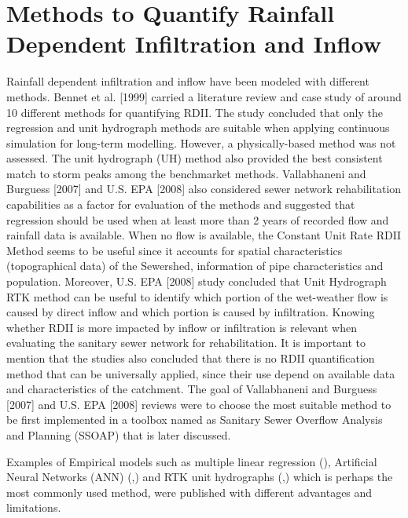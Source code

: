 \section{Methods to Quantify Rainfall Dependent Infiltration and Inflow}
\label{methods_rdii}

Rainfall dependent infiltration and inflow have been modeled with different methods. Bennet et al. [1999] \cite{Bennett1999} carried a literature review and case study of around 10 different methods for quantifying RDII. 
The study concluded that only the regression and unit hydrograph methods are suitable when applying continuous simulation for long-term modelling. However, a physically-based method was not assessed. The unit hydrograph (UH) method also provided the best consistent match to storm peaks among the benchmarket methods. Vallabhaneni and Burguess [2007] \cite{Vallabhaneni2007} and U.S. EPA [2008] \cite{epa2008}  also considered sewer network rehabilitation capabilities as a factor for evaluation of the methods and suggested that regression should be used when at least more than 2 years of recorded flow and rainfall data is available. When no flow is available, the Constant Unit Rate RDII Method seems to be useful since it accounts for spatial characteristics (topographical data) of the Sewershed, information of pipe characteristics and population. Moreover, U.S. EPA [2008] study concluded that Unit Hydrograph RTK method can be useful to identify which portion of the wet-weather flow is caused by direct inflow and which portion is caused by infiltration. Knowing whether RDII is more impacted by inflow or infiltration is relevant when evaluating the sanitary sewer network for rehabilitation. 
It is important to mention that the studies also concluded that there is no RDII quantification method that can be universally applied, since their use depend on available data and characteristics of the catchment. The goal of Vallabhaneni and Burguess [2007] and U.S. EPA [2008] reviews were to choose the most suitable method to be first implemented in a toolbox named as Sanitary Sewer Overflow Analysis and Planning (SSOAP) that is later discussed. 


Examples of Empirical models such as multiple linear regression (\citet{Li2019}), Artificial Neural Networks (ANN) (\citet{Djebbar1998},\citet{Walker2014}) and RTK unit hydrographs (\citet{Muleta2008},\citet{Gheith2011}) which is perhaps the most commonly used method, were published with different advantages and limitations.

